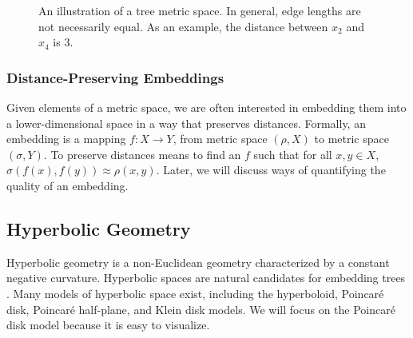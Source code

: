 \documentclass{article}
\begin{document}
\begin{figure}[ht]
  \centering
  \caption{An illustration of a tree metric space. In general, edge lengths are not necessarily equal. As an example, the distance between $x_2$ and $x_4$ is $3$.}
  \label{fig:tree-metric-space}
\end{figure}

\subsubsection{Distance-Preserving Embeddings}

Given elements of a metric space, we are often interested in embedding them into a lower-dimensional space in a way that preserves distances. Formally, an embedding is a mapping $f: X \rightarrow Y$, from metric space $(\rho, X)$ to metric space $(\sigma, Y)$. To preserve distances means to find an $f$ such that for all $x,y \in X$, $\sigma(f(x),f(y)) \approx \rho(x,y)$. Later, we will discuss ways of quantifying the quality of an embedding.

\subsection{Hyperbolic Geometry}

Hyperbolic geometry is a non-Euclidean geometry characterized by a constant negative curvature. Hyperbolic spaces are natural candidates for embedding trees \cite{sarkar2011low}. Many models of hyperbolic space exist, including the hyperboloid, Poincaré disk, Poincaré half-plane, and Klein disk models. We will focus on the Poincaré disk model because it is easy to visualize.
\end{document}
